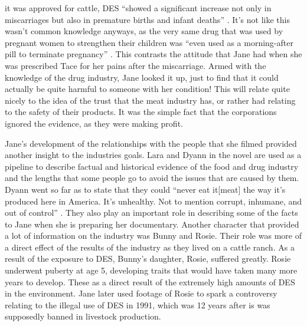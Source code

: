 \documentclass{article}
\begin{document}
it was approved for cattle, DES ``showed a significant increase not only in
miscarriages but also in premature births and infant deaths''
\cite{ozeki1998my}. It's not like this wasn't common knowledge anyways, as
the very same drug that was used by pregnant women to strengthen their
children was ``even used as a morning-after pill to terminate pregnancy''
\cite{ozeki1998my}. This contrasts the attitude that Jane had when she was
prescribed Tace for her pains after the miscarriage. Armed with the
knowledge of the drug industry, Jane looked it up, just to find that it
could actually be quite harmful to someone with her condition! This will
relate quite nicely to the idea of the trust that the meat industry has, or
rather had relating to the safety of their products. It was the simple fact
that the corporations ignored the evidence, as they were making profit.

Jane's development of the relationships with the people that she filmed
provided another insight to the industries goals. Lara and Dyann in the
novel are used as a pipeline to describe factual and historical evidence of
the food and drug industry and the lengths that some people go to avoid the
issues that are caused by them. Dyann went so far as to state that they
could ``never eat it[meat] the way it’s produced here in America. It’s
unhealthy. Not to mention corrupt, inhumane, and out of control''
\cite{ozeki1998my}. They also play an important role in describing some of
the facts to Jane when she is preparing her documentary. Another character
that provided a lot of information on the industry was Bunny and Rosie.
Their role was more of a direct effect of the results of the industry as they
lived on a cattle ranch. As a result of the exposure to DES, Bunny's
daughter, Rosie, suffered greatly. Rosie underwent puberty at age 5,
developing traits that would have taken many more years to develop. These as
a direct result of the extremely high amounts of DES in the environment. Jane
later used footage of Rosie to spark a controversy relating to the illegal
use of DES in 1991, which was 12 years after is was supposedly banned in
livestock production.

\end{document}
